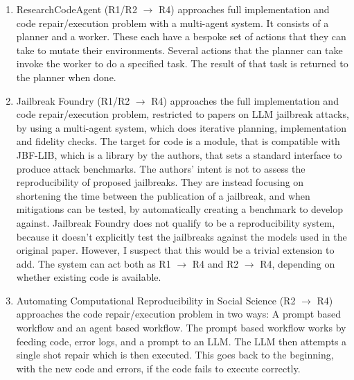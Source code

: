 \documentclass[8pt,a4paper]{article}
\begin{document}
\begin{enumerate}
            I've not classed this system as an assessment system, because the paper has nothing to say on how 
            the researcher should decide if an experiment has been successfully reproduced.
    \item ResearchCodeAgent\cite{researchcodeagent} (R1/R2 $\rightarrow$ R4)
        \subitem approaches full implementation and code repair/execution problem with a multi-agent system. 
        It consists of a planner and a worker. These each have a bespoke set of actions that they can take to mutate their environments.
        Several actions that the planner can take invoke the worker to do a specified task. 
        The result of that task is returned to the planner when done.
    \item Jailbreak Foundry\cite{jailbreakfoundry} (R1/R2 $\rightarrow$ R4)
        \subitem approaches the full implementation and code repair/execution problem, restricted to papers on LLM jailbreak attacks, 
        by using a multi-agent system, which does iterative planning, implementation and fidelity checks.
        The target for code is a module, that is compatible with JBF-LIB, which is a library by the authors, 
        that sets a standard interface to produce attack benchmarks.
        The authors' intent is not to assess the reproducibility of proposed jailbreaks. 
        They are instead focusing on shortening the time between the publication of a jailbreak, 
        and when mitigations can be tested, by automatically creating a benchmark to develop against.
        Jailbreak Foundry does not qualify to be a reproducibility system, 
        because it doesn't explicitly test the jailbreaks against the models used in the original paper.
        However, I suspect that this would be a trivial extension to add.
        The system can act both as R1 $\rightarrow$ R4 and R2 $\rightarrow$ R4, depending on whether existing code is available.
    \item Automating Computational Reproducibility in Social Science\cite{shah2026} (R2 $\rightarrow$ R4)
        \subitem approaches the code repair/execution problem in two ways: A prompt based workflow and an agent based workflow.
        The prompt based workflow works by feeding code, error logs, and a prompt to an LLM.
        The LLM then attempts a single shot repair which is then executed. This goes back to the beginning, with the new code and errors,
        if the code fails to execute correctly.


\end{enumerate}
\end{document}

